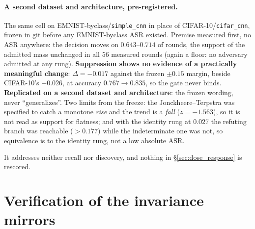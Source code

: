\documentclass{article}
\begin{document}
\paragraph{A second dataset and architecture, pre-registered.} The same cell on EMNIST-byclass/\texttt{simple\_cnn} in place of CIFAR-10/\texttt{cifar\_cnn}, frozen in git before any EMNIST-byclass ASR existed. Premise measured first, no ASR anywhere: the decision moves on $0.643$--$0.714$ of rounds, the support of the admitted mass unchanged in all $56$ measured rounds (again a floor: no adversary admitted at any rung). \textbf{Suppression shows no evidence of a practically meaningful change}: $\Delta = -0.017$ against the frozen $\pm 0.15$ margin, beside CIFAR-10's $-0.026$, at accuracy $0.767 \to 0.835$, so the gate never binds. \textbf{Replicated on a second dataset and architecture}: the frozen wording, never ``generalizes''. Two limits from the freeze: the Jonckheere--Terpstra was specified to catch a monotone \emph{rise} and the trend is a \emph{fall} ($z{=}{-}1.563$), so it is not read as support for flatness; and with the identity rung at $0.027$ the refuting branch was reachable ($>0.177$) while the indeterminate one was not, so equivalence is to the identity rung, not a low absolute ASR.

It addresses neither recall nor discovery, and nothing in \S\ref{sec:dose_response} is rescored.

\section{Verification of the invariance mirrors}
\label{app:mirrors}
\end{document}

